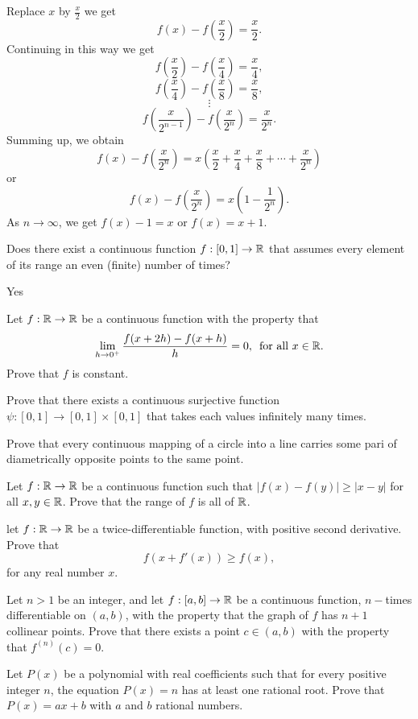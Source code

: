 \begin{solution}
    Replace $x$ by $\frac{x}{2}$ we get
    $$f(x)-f\left(\frac{x}{2}\right)=\frac{x}{2}.$$
    Continuing in this way we get
    $$f\left(\frac{x}{2}\right)-f\left(\frac{x}{4}\right)=\frac{x}{4},$$
    $$f\left(\frac{x}{4}\right)-f\left(\frac{x}{8}\right)=\frac{x}{8},$$
    $$\vdots$$
    $$f\left(\frac{x}{2^{n-1}}\right)-f\left(\frac{x}{2^n}\right)=\frac{x}{2^n}.$$
    Summing up, we obtain
    $$f(x)-f\left(\frac{x}{2^n}\right)=x\left(\frac{x}{2}+\frac{x}{4}+\frac{x}{8}+\cdots+\frac{x}{2^n}\right)$$
    or
    $$f(x)-f\left(\frac{x}{2^n}\right)=x\left(1-\frac{1}{2^n}\right).$$
    As $n\to\infty$, we get $f(x)-1=x$ or $f(x)=x+1$.
\end{solution}

\question[P\&B, 387] Does there exist a continuous function $f:[0,1]\to\mathbb{R}$ that assumes every element of its range an even (finite) number of times?
\begin{solution}
    Yes
\end{solution}

\question[P\&B, 389] Let $f:\mathbb{R}\to\mathbb{R}$ be a continuous function with the property that
$$\lim_{h\to 0^+}{\frac{f(x+2h)-f(x+h)}{h}}=0,\,\,\,\text{for all}\,\, x\in\mathbb{R}.$$
Prove that $f$ is constant.

\question[P\&B, 392] Prove that there exists a continuous surjective function $\psi:[0,1]\to[0,1]\times[0,1]$ that takes each values infinitely many times.

\question Prove that every continuous mapping of a circle into a line carries some pari of diametrically opposite points to the same point.

\question[P\&B, 397] Let $f:\mathbb{R}\to\mathbb{R}$ be a continuous function such that $|f(x)-f(y)|\geq|x-y|$ for all $x, y\in\mathbb{R}$. Prove that the range of $f$ is all of $\mathbb{R}$.

\question let $f:\mathbb{R}\to\mathbb{R}$ be a twice-differentiable function, with positive second derivative. Prove that $$f(x+f'(x))\geq f(x),$$ for any real number $x$.

\question[P\&B, 418] Let $n>1$ be an integer, and let $f:[a,b]\to\mathbb{R}$ be a continuous function, $n-$times differentiable on $(a,b)$, with the property that the graph of $f$ has $n+1$ collinear points. Prove that there exists a point $c\in(a,b)$ with the property that $f^{(n)}(c)=0$.

\question[P\&B, 424] Let $P(x)$ be a polynomial with real coefficients such that for every positive integer $n$, the equation $P(x)=n$ has at least one rational root. Prove that $P(x)=ax+b$ with $a$ and $b$ rational numbers.


